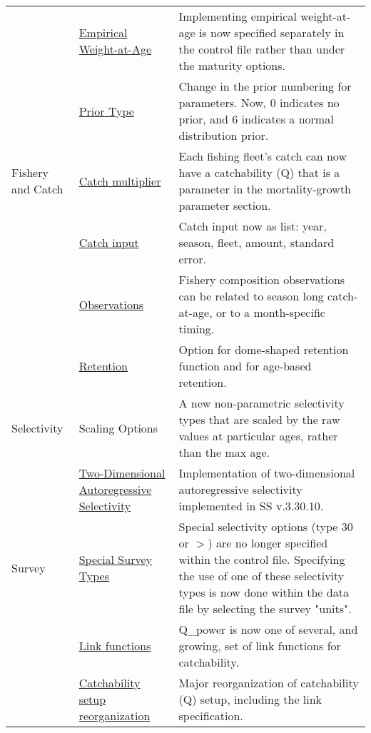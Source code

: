 \begin{center}
{\begin{longtable}{p{2cm} p{3cm} p{10cm}}
		  & \hyperlink{WAAparm} {Empirical Weight-at-Age} & Implementing empirical weight-at-age is now specified separately in the control file rather than under the maturity options.\\

		  & \hyperlink{Priors}{Prior Type} & Change in the prior numbering for parameters.  Now, 0 indicates no prior, and 6 indicates a normal distribution prior.\\

		Fishery and Catch & 
			\hyperlink{CatchMult}{Catch multiplier} & 
				Each fishing fleet's catch can now have a catchability (Q) that is a parameter in the mortality-growth parameter section.\\
				
			& \hyperlink{CatchFormat}{Catch input} & 
				Catch input now as list:  year, season, fleet, amount, standard error. \\
				
			& \hyperlink{CompTiming}{Observations} & 
				Fishery composition observations can be related to season long catch-at-age, or to a month-specific timing.\\
		
			& \hyperlink{DomeRetention}{Retention} & 
				Option for dome-shaped retention function and for age-based retention. \\

		Selectivity 
			& Scaling Options & 	
				A new non-parametric selectivity types that are scaled by the raw values at particular ages, rather than the max age.\\
			& \hyperlink{2DAR}{Two-Dimensional Autoregressive Selectivity} &
				Implementation of two-dimensional autoregressive selectivity implemented in SS v.3.30.10.\\

		Survey
			& \hyperlink{SpecialSurvey}{Special Survey Types} & 
				Special selectivity options (type 30 or $>$) are no longer specified within the control file.  Specifying the use of one of these selectivity types is now done within the data file by selecting the survey "units". \\  

			& \hyperlink{Qsetup}{Link functions} & 
				Q\_power is now one of several, and growing, set of link functions for catchability. \\
				
			& \hyperlink{Qsetup}{Catchability setup reorganization} & 
				Major reorganization of catchability (Q) setup, including the link specification. \\
			

\end{longtable}}
\end{center}
